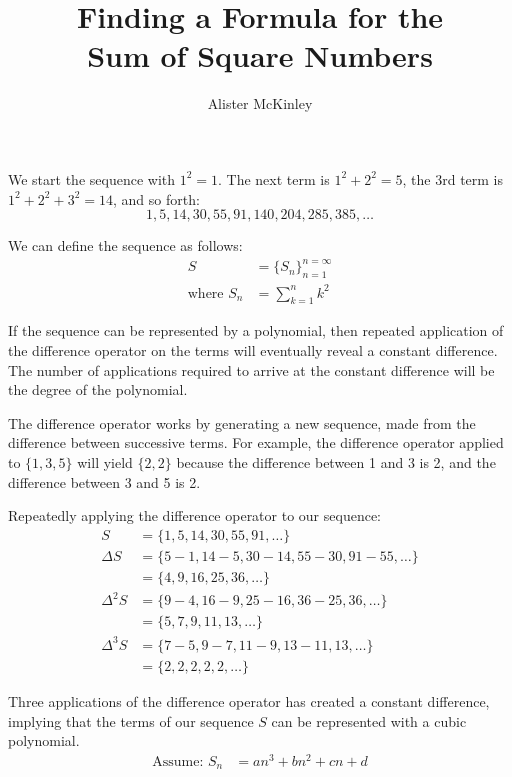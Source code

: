 \documentclass{article}
\title{Finding a Formula for the\\Sum of Square Numbers}
\author{Alister McKinley}
\date{}
\begin{document}
\maketitle

We start the sequence with \(1^2=1\). The next term is \(1^2+2^2=5\), the 3rd term is \(1^2+2^2+3^2=14\), and so forth:
\[ 1, 5, 14, 30, 55, 91, 140, 204, 285, 385, \dots \]

We can define the sequence as follows:
\[\begin{aligned}
    S &= \{S_n\}_{n=1}^{n=\infty} \\
    \text{where } S_n &= \sum_{k=1}^{n}k^2
\end{aligned}\]

If the sequence can be represented by a polynomial, then repeated application of the difference operator on the terms will eventually reveal a constant difference. The number of applications required to arrive at the constant difference will be the degree of the polynomial.

The difference operator works by generating a new sequence, made from the difference between successive terms. For example, the difference operator applied to \(\{1, 3, 5\}\) will yield \(\{2, 2\}\) because the difference between 1 and 3 is 2, and the difference between 3 and 5 is 2.

Repeatedly applying the difference operator to our sequence:
\[\begin{aligned}
    S &= \{1, 5, 14, 30, 55, 91, \dots\} \\
    \Delta S &= \{5-1, 14-5, 30-14, 55-30, 91-55, \dots\} \\
    &= \{4, 9, 16, 25, 36, \dots\} \\
    \Delta^2S &= \{9-4, 16-9, 25-16, 36-25, 36, \dots\} \\
    &= \{5, 7, 9, 11, 13, \dots\} \\
    \Delta^3S &= \{7-5, 9-7, 11-9, 13-11, 13, \dots\} \\
    &= \{2, 2, 2, 2, 2, \dots\}
\end{aligned}\]

Three applications of the difference operator has created a constant difference, implying that the terms of our sequence \(S\) can be represented with a cubic polynomial.
\[\begin{aligned}
    \text{Assume: } S_n &= an^3+bn^2+cn+d \\
\end{aligned}\]
\end{document}
